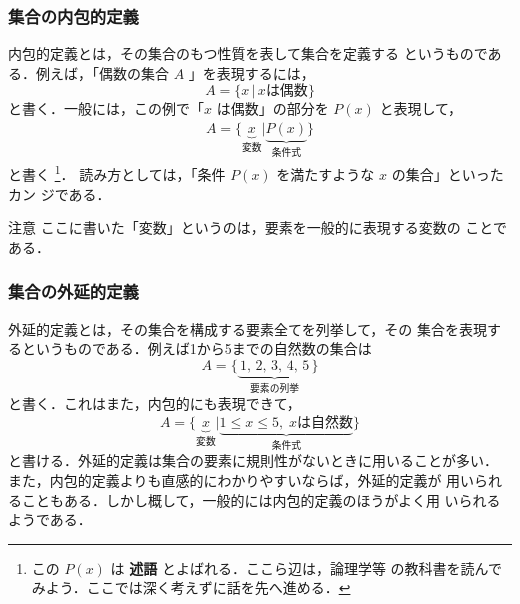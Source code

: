                 \subsubsection{集合の内包的定義}
                    内包的定義とは，その集合のもつ性質を表して集合を定義する
                    というものである．例えば，「偶数の集合 $A$ 」を表現するには，
                                \begin{equation*}
                                    A=\{ x \,| \, x \mbox{は偶数} \}
                                \end{equation*}
                    と書く．一般には，この例で「$x$ は偶数」の部分を $P(x)$ と表現して，
                                \begin{align}
                                    A=\{\underbrace{ x }_{\mbox{変数}}|\underbrace{ P(x) }_{\mbox{条件式}}\}
                                \end{align}
                    と書く
                        \footnote{
                            この $P(x)$ は \textbf{述語} とよばれる．ここら辺は，論理学等
                            の教科書を読んでみよう．ここでは深く考えずに話を先へ進める．
                        }．
                    読み方としては，「条件 $P(x)$ を満たすような $x$ の集合」といったカン
                    ジである．

                    \begin{memo}{注意}
                        ここに書いた「変数」というのは，要素を一般的に表現する変数の
                        ことである．
                    \end{memo}

                \subsubsection{集合の外延的定義}
                    外延的定義とは，その集合を構成する要素全てを列挙して，その
                    集合を表現するというものである．例えば1から5までの自然数の集合は
                        \begin{equation*}
                            A=\{\underbrace{\,1,\,2,\,3,\,4,\,5\,}_{\mbox{要素の列挙}}\}
                        \end{equation*}
                    と書く．これはまた，内包的にも表現できて，
                        \begin{equation*}
                            A=\{\underbrace{ x }_{\mbox{変数}}|\underbrace{ 1\leq x\leq 5,\; x\mbox{は自然数} }_{\mbox{条件式}}\}
                        \end{equation*}
                    と書ける．外延的定義は集合の要素に規則性がないときに用いることが多い．
                    また，内包的定義よりも直感的にわかりやすいならば，外延的定義が
                    用いられることもある．しかし概して，一般的には内包的定義のほうがよく用
                    いられるようである．




